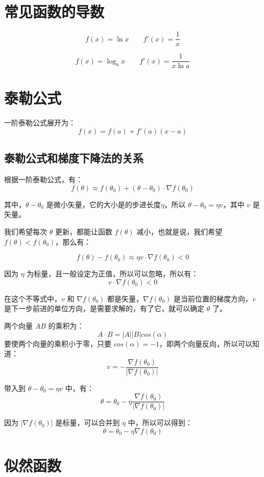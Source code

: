 \documentclass[12pt]{article}
\begin{document}
\section{常见函数的导数}
$$ f(x) = \ln{x} \qquad f'(x) = \frac{1}{x} $$

$$ f(x) = \log_ax \qquad f'(x) = \frac{1}{x\ln{a}} $$

\section{泰勒公式}
一阶泰勒公式展开为：
$$ f(x) = f(a) + f'(a)(x-a) $$

\subsection{泰勒公式和梯度下降法的关系}
根据一阶泰勒公式，有：
$$ f(\theta) \approx f(\theta_0) + (\theta - \theta_0) \cdot \nabla f(\theta_0) $$

其中，$\theta - \theta_0$ 是微小矢量，它的大小是的步进长度$\eta$，所以 $\theta - \theta_0 = \eta v$，其中 $v$ 是矢量。

我们希望每次 $\theta$ 更新，都能让函数 $f(\theta)$ 减小，也就是说，我们希望 $f(\theta) < f(\theta_0)$，那么有：

$$ f(\theta) - f(\theta_0) \approx \eta v \cdot \nabla f(\theta_0) < 0 $$

因为 $\eta$ 为标量，且一般设定为正值，所以可以忽略，所以有：
$$ v \cdot \nabla f(\theta_0) < 0$$

在这个不等式中，$v$ 和 $\nabla f(\theta_0) $ 都是矢量，$\nabla f(\theta_0)$ 是当前位置的梯度方向，$v$ 是下一步前进的单位方向，是需要求解的，有了它，就可以确定 $\theta$ 了。

两个向量 $A B$ 的乘积为：
$$ A \cdot B = |A||B|cos(\alpha)$$
要使两个向量的乘积小于零，只要 $cos(\alpha) = -1$，即两个向量反向，所以可以知道：
$$ v = - \frac{\nabla f(\theta_0)}{|\nabla f(\theta_0)|}$$

带入到 $\theta - \theta_0 = \eta v$ 中，有：
$$ \theta = \theta_0 - \eta \frac{\nabla f(\theta_0)}{|\nabla f(\theta_0)|}$$

因为 $|\nabla f(\theta_0)|$ 是标量，可以合并到 $\eta$ 中，所以可以得到：
$$ \theta = \theta_0 - \eta \nabla f(\theta_0)$$

\section{似然函数}
\end{document}
